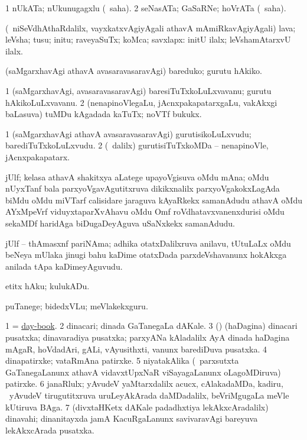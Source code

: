 \bentry
{}
\gl{\nA}
\bmng
\bnum
\num{1} nUkATa; nUkunugagxlu (\rUpa\ saha). 
\num{2} seNasATa; GaSaRNe; hoVrATa (\rUpa\ saha). 
\enum
\emng
\eentry

\bentry
{}
\gl{\nA}
\bmng
(\sA\ niSeVdhAthaRdalilx, vayxkatxvAgiyAgali athavA mAmiRkavAgiyAgali) lava; leVsha; tusu; initu; raveyaSuTx; koMca; savxlapx:  initU ilalx; leVshamAtarxvU ilalx. 
\emng
\eentry

\bentry
{}
\gl{\sakirx}
\bmng
(saMgarxhavAgi athavA avasaravasaravAgi) bareduko; gurutu hAkiko. 
\emng
\eentry

\bentry
{}
\gl{\nA}
\bmng
\bnum
\num{1} (saMgarxhavAgi, avasaravasaravAgi) baresiTuTxkoLuLxvavanu; gurutu hAkikoLuLxvavanu. 
\num{2} (nenapinoVlegaLu, jAcnxpakapatarxgaLu, \mo vakAkxgi baLasuva) tuMDu kAgadada kaTuTx; noVTf bukukx. 
\enum
\emng
\eentry

\bentry
{}
\gl{\nA}
\bmng
\bnum
\num{1} (saMgarxhavAgi athavA avasaravasaravAgi) gurutisikoLuLxvudu; barediTuTxkoLuLxvudu. 
\num{2} (\kanmu\ \bava dalilx) gurutisiTuTxkoMDa -- nenapinoVle, jAcnxpakapatarx. 
\enum
\emng
\eentry

\bentry
{}
\gl{\nA}
\expl{(\Bwvi)}
\bmng
jUlf; kelasa athavA shakitxya aLatege upayoVgisuva oMdu mAna; oMdu nUyxTanf bala parxyoVgavAgutitxruva dikikxnalilx parxyoVgakokxLagAda biMdu oMdu miVTarf calisidare jaraguva kAyaRkekx samanAdudu athavA oMdu AYxMpeVrf viduyxtaparXvAhavu oMdu Omf roVdhatavxvanenxdurisi oMdu sekaMDf haridAga biDugaDeyAguva uSaNxkekx samanAdudu. 
\emng
\eentry

\bentry
{}
\gl{\nA}
\bmng
jUlf -- thAmasxnf pariNAma; adhika otatxDalilxruva anilavu, tUtuLaLx oMdu beNeya mUlaka jinugi bahu kaDime otatxDada parxdeVshavanunx hokAkxga anilada tApa kaDimeyAguvudu. 
\emng
\eentry

\bentry
{}
\gl{\sakirx}
\bmng
etitx hAku; kulukADu. 
\emng

\noindent
\gl{\akirx}
\bmng
puTanege; bidedxVLu; meVlakekxguru. 
\emng
\eentry

\bentry
{}
\gl{\nA}
\bmng
\bnum
\num{1} = \hyperref{kandict_d.pdf}{D}{day-book}{day-book}. 
\num{2} dinacari; dinada GaTanegaLa dAKale. 
\num{3} (\nw) (haDagina) dinacari pusatxka; dinavaradiya pusatxka; parxyANa kAladalilx AyA dinada haDagina mAgaR, hoVdadAri, gALi, vAyusithxti, \mo vanunx barediDuva pusatxka. 
\num{4} dinapatirxke; vataRmAna patirxke. 
\num{5} niyatakAlika (\kanmu\ parxsutxta GaTanegaLanunx athavA vidavxtUpxNaR viSayagaLanunx oLagoMDiruva) patirxke. 
\num{6} janaRlulx; yAvudeV yaMtarxdalilx acucx, cAlakadaMDa, kadiru, \mo\ yAvudeV tirugutitxruva uruLeyAkArada daMDadalilx, beVriMgugaLa meVle kUtiruva BAga. 
\num{7} (divxtaHKetx dAKale padadhxtiya lekAkxcAradalilx) dinavahi; dinanitayxda jamA KacuRgaLanunx savivaravAgi bareyuva lekAkxcArada pusatxka. 
\enum
\emng

